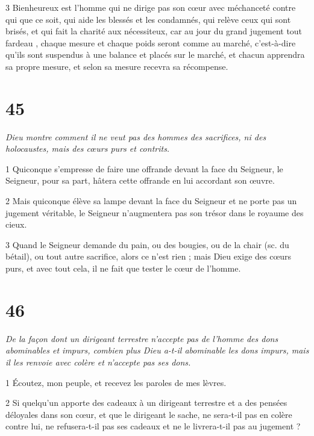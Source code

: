 \par 3 Bienheureux est l'homme qui ne dirige pas son cœur avec méchanceté contre qui que ce soit, qui aide les blessés et les condamnés, qui relève ceux qui sont brisés, et qui fait la charité aux nécessiteux, car au jour du grand jugement tout fardeau , chaque mesure et chaque poids seront comme au marché, c'est-à-dire qu'ils sont suspendus à une balance et placés sur le marché, et chacun apprendra sa propre mesure, et selon sa mesure recevra sa récompense.



\chapter{45}

\par \textit{Dieu montre comment il ne veut pas des hommes des sacrifices, ni des holocaustes, mais des cœurs purs et contrits.}

\par 1 Quiconque s'empresse de faire une offrande devant la face du Seigneur, le Seigneur, pour sa part, hâtera cette offrande en lui accordant son œuvre.

\par 2 Mais quiconque élève sa lampe devant la face du Seigneur et ne porte pas un jugement véritable, le Seigneur n'augmentera pas son trésor dans le royaume des cieux.

\par 3 Quand le Seigneur demande du pain, ou des bougies, ou de la chair (sc. du bétail), ou tout autre sacrifice, alors ce n'est rien ; mais Dieu exige des cœurs purs, et avec tout cela, il ne fait que tester le cœur de l'homme.

\chapter{46}

\par \textit{De la façon dont un dirigeant terrestre n'accepte pas de l'homme des dons abominables et impurs, combien plus Dieu a-t-il abominable les dons impurs, mais il les renvoie avec colère et n'accepte pas ses dons.}

\par 1 Écoutez, mon peuple, et recevez les paroles de mes lèvres.

\par 2 Si quelqu'un apporte des cadeaux à un dirigeant terrestre et a des pensées déloyales dans son cœur, et que le dirigeant le sache, ne sera-t-il pas en colère contre lui, ne refusera-t-il pas ses cadeaux et ne le livrera-t-il pas au jugement ?

